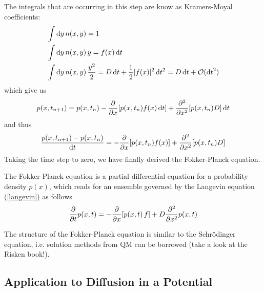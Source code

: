 \documentclass{/home/ben/Templates/notebook}
\begin{document}
	The integrals that are occurring in this step are know as Kramers-Moyal coefficients:
	\begin{align*}
		&\int \dd{y} n(x,y) = 1 \\
		&\int \dd{y} n(x,y) \, y = f(x) \dd{t} \\
		&\int \dd{y} n(x,y) \, \frac{y^2}{2} = D \dd{t} + \frac{1}{2}[f(x)]^2 \dd{t^2} = D \dd{t} + \mathcal{O}(\dd{t}^2)
	\end{align*}
	which give us
	\begin{equation}
	p(x,t_{n+1}) = p(x,t_n) - \pdv{x} [p(x,t_n) f(x) \dd{t}] + \pdv[2]{x}[p(x,t_n) D]\dd{t}
	\end{equation}
	and thus
	\begin{equation}
	\frac{p(x,t_{n+1}) - p(x,t_n)}{\dd{t}} =  -\pdv{x} [p(x,t_n) f(x)] + \pdv[2]{x}[p(x,t_n) D]
	\end{equation}
	Taking the time step to zero, we have finally derived the Fokker-Planck equation.
	\begin{theorem}
		The Fokker-Planck equation is a partial differential equation for a probability density $p(x)$, which reads for an ensemble governed by the Langevin equation (\ref{langevin}) as follows
		\begin{equation}
		\pdv{t} p(x,t) = -\pdv{x}[p(x,t) \, f] + D \pdv[2]{x} p(x,t)
		\end{equation}
	\end{theorem}
	The structure of the Fokker-Planck equation is similar to the Schrödinger equation, i.e. solution methods from QM can be borrowed (take a look at the Risken book!). 
	
	\subsection*{Application to Diffusion in a Potential}
	
\end{document}
